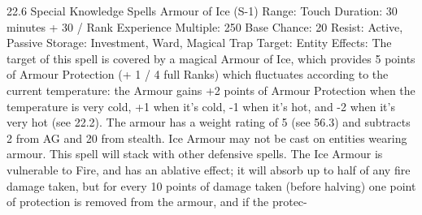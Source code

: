 \documentclass[a4paper]{article}
\begin{document}
\begin{multicols}{3}
22.6 Special Knowledge Spells
Armour of Ice (S-1)
Range: Touch
Duration: 30 minutes + 30 / Rank
Experience Multiple: 250
Base Chance: 20%
Resist: Active, Passive
Storage: Investment, Ward, Magical Trap
Target: Entity
Effects: The target of this spell is covered by a
magical Armour of Ice, which provides 5 points of
Armour Protection (+ 1 / 4 full Ranks) which fluctuates according to the current temperature: the
Armour gains +2 points of Armour Protection
when the temperature is very cold, +1 when it’s
cold, -1 when it’s hot, and -2 when it’s very hot
(see 22.2). The armour has a weight rating of 5 (see
56.3) and subtracts 2 from AG and 20 from stealth.
Ice Armour may not be cast on entities wearing
armour. This spell will stack with other defensive
spells. The Ice Armour is vulnerable to Fire, and
has an ablative effect; it will absorb up to half of
any fire damage taken, but for every 10 points of
damage taken (before halving) one point of protection is removed from the armour, and if the protec-


\end{multicols}
\end{document}
